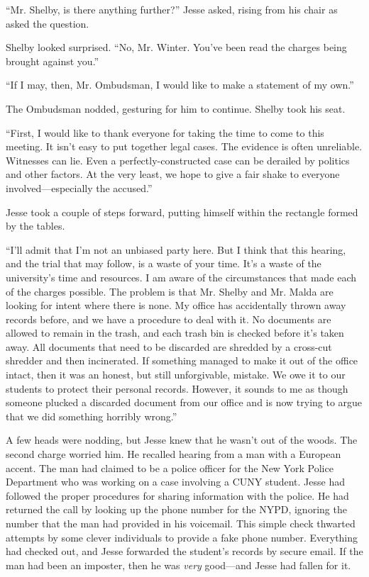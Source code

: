 \documentclass[12pt]{book}
\begin{document}
``Mr. Shelby, is there anything further?'' Jesse asked, rising from his chair as asked the question.

Shelby looked surprised.  ``No, Mr. Winter.  You've been read the charges being brought against you.''

``If I may, then, Mr. Ombudsman, I would like to make a statement of my own.''

The Ombudsman nodded, gesturing for him to continue.  Shelby took his seat.

``First, I would like to thank everyone for taking the time to come to this meeting.  It isn't easy to put together legal cases.  The evidence is often unreliable.  Witnesses can lie.  Even a perfectly-constructed case can be derailed by politics and other factors.  At the very least, we hope to give a fair shake to everyone involved---especially the accused.''

Jesse took a couple of steps forward, putting himself within the rectangle formed by the tables.

``I'll admit that I'm not an unbiased party here.  But I think that this hearing, and the trial that may follow, is a waste of your time.  It's a waste of the university's time and resources.  I am aware of the circumstances that made each of the charges possible.  The problem is that Mr. Shelby and Mr. Malda are looking for intent where there is none.  My office has accidentally thrown away records before, and we have a procedure to deal with it.  No documents are allowed to remain in the trash, and each trash bin is checked before it's taken away.  All documents that need to be discarded are shredded by a cross-cut shredder and then incinerated.  If something managed to make it out of the office intact, then it was an honest, but still unforgivable, mistake.  We owe it to our students to protect their personal records.  However, it sounds to me as though someone plucked a discarded document from our office and is now trying to argue that we did something horribly wrong.''

A few heads were nodding, but Jesse knew that he wasn't out of the woods.  The second charge worried him.  He recalled hearing from a man with a European accent.  The man had claimed to be a police officer for the New York Police Department who was working on a case involving a CUNY student.  Jesse had followed the proper procedures for sharing information with the police.  He had returned the call by looking up the phone number for the NYPD, ignoring the number that the man had provided in his voicemail.  This simple check thwarted attempts by some clever individuals to provide a fake phone number.  Everything had checked out, and Jesse forwarded the student's records by secure email.  If the man had been an imposter, then he was \emph{very} good---and Jesse had fallen for it.
\end{document}
